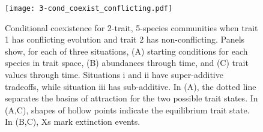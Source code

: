 \begin{figure}[ht!]
\centering
\texttt{[image: 3-cond\_coexist\_conflicting.pdf]}
\caption{Conditional coexistence for 2-trait, 5-species communities when trait 1 has 
    conflicting evolution and trait 2 has non-conflicting.
    Panels show, for each of three situations,
    (A) starting conditions for each species in trait space, 
    (B) abundances through time, and 
    (C) trait values through time.
    Situations i and ii have super-additive tradeoffs, while situation iii has 
    sub-additive.
    In (A), the dotted line separates the basins of attraction for the two possible
    trait states.
    In (A,C), shapes of hollow points indicate the equilibrium trait state.
    In (B,C), Xs mark extinction events.
}
\label{fig:conditional-coexistence}
\end{figure}











